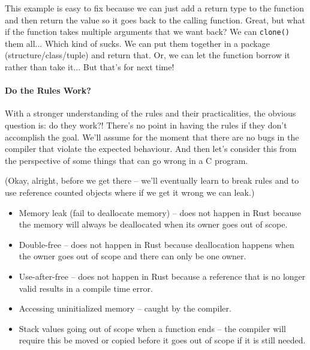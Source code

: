 This example is easy to fix because we can just add a return type to the function and then return the value so it goes back to the calling function. Great, but what if the function takes multiple arguments that we want back? We can \texttt{clone()} them all... Which kind of sucks. We can put them together in a package (structure/class/tuple) and return that. Or, we can let the function borrow it rather than take it... But that's for next time!

\paragraph{Do the Rules Work?}
With a stronger understanding of the rules and their practicalities, the obvious question is: do they work?! There's no point in having the rules if they don't accomplish the goal. We'll assume for the moment that there are no bugs in the compiler that violate the expected behaviour. And then let's consider this from the perspective of some things that can go wrong in a C program.

(Okay, alright, before we get there -- we'll eventually learn to break rules and to use reference counted objects where if we get it wrong we can leak.)

\begin{itemize}
	\item Memory leak (fail to deallocate memory) -- does not happen in Rust because the memory will always be deallocated when its owner goes out of scope.
	\item Double-free -- does not happen in Rust because deallocation happens when the owner goes out of scope and there can only be one owner.
	\item Use-after-free -- does not happen in Rust because a reference that is no longer valid results in a compile time error.
	\item Accessing uninitialized memory -- caught by the compiler.
	\item Stack values going out of scope when a function ends -- the compiler will require this be moved or copied before it goes out of scope if it is still needed.
\end{itemize}




